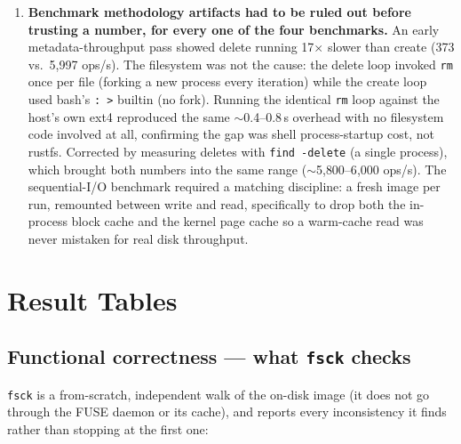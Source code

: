 \documentclass[11pt]{article}
\begin{document}
\begin{enumerate}
    2048-inode filesystem printed \texttt{total\_inodes 24} (an offset) instead of \texttt{2048} (the
    actual count) — a purely cosmetic bug, since every actual consistency check downstream read the
    correct field values via ordinary struct access; only the printed dump was wrong. Caught while
    diagnosing the \texttt{fsck} scan-time benchmark (Section 4.2, Benchmark 4) and fixed by replacing
    every \texttt{offset\_of!} call with the field itself.
    \item \textbf{Benchmark methodology artifacts had to be ruled out before trusting a number,
    for every one of the four benchmarks.} An early metadata-throughput pass showed delete running
    17$\times$ slower than create (373 vs.\ 5{,}997 ops/s). The filesystem was not the cause: the delete
    loop invoked \texttt{rm} once per file (forking a new process every iteration) while the create loop
    used bash's \texttt{: >} builtin (no fork). Running the identical \texttt{rm} loop against the host's
    own ext4 reproduced the same $\sim$0.4--0.8\,s overhead with no filesystem code involved at all,
    confirming the gap was shell process-startup cost, not rustfs. Corrected by measuring deletes with
    \texttt{find -delete} (a single process), which brought both numbers into the same range
    ($\sim$5{,}800--6{,}000 ops/s). The sequential-I/O benchmark required a matching discipline: a fresh
    image per run, remounted between write and read, specifically to drop both the in-process block
    cache and the kernel page cache so a warm-cache read was never mistaken for real disk throughput.
\end{enumerate}

\section{Result Tables}

\subsection{Functional correctness --- what \texttt{fsck} checks}

\texttt{fsck} is a from-scratch, independent walk of the on-disk image (it does not go through the
FUSE daemon or its cache), and reports every inconsistency it finds rather than stopping at the first
one:
\end{document}

